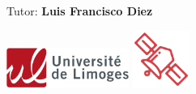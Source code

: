 \begin{titlepage}
\begin{center}
        \vspace{0.5cm}
        Tutor:
        \textbf{Luis Francisco Diez}

        \vspace{2cm}

        \includegraphics[width=0.3\textwidth]{Images/unilim.png} \hfill
        \includegraphics[width=0.14\textwidth]{Images/ELT.png}



            
    \end{center}
\end{titlepage}
